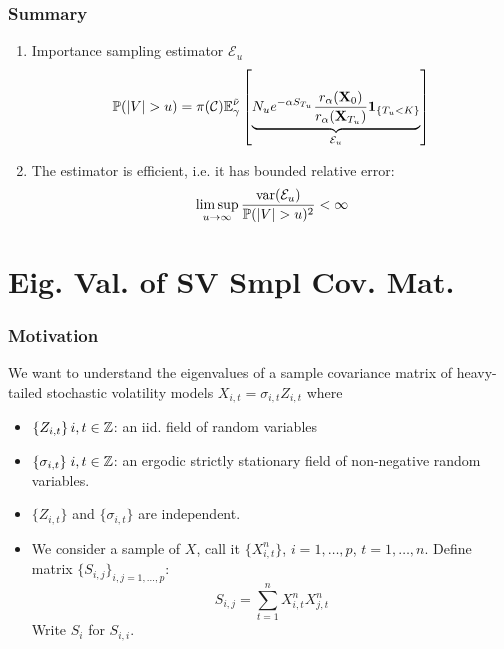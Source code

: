 \documentclass{beamer}
\begin{document}
\begin{frame}
  \frametitle{Summary}
  \begin{enumerate}
  \item Importance sampling estimator $\mathcal E_u$
    \[
    \mathbb{P}(|V| > u)
    =
    \pi(\mathcal C) \mathbb{E}_\gamma^{\tilde \nu} \left[
      \underbrace{
        N_u e^{-\alpha S_{T_u}} {r_\alpha(\mathbf{X}_0) \over r_\alpha(\mathbf{X}_{T_u})} \mathbf{1}_{\{T_u < K\}}
        }_{\mathcal E_u}
    \right]
    \]
  \item The estimator is efficient, i.e. it has bounded relative error:
    \[
    \limsup_{u \to \infty} {
      \text{var}(\mathcal E_u)
      \over
      \mathbb{P}(|V| > u)^2
    } < \infty
    \]
  \end{enumerate}
\end{frame}

\section{Eig. Val. of SV Smpl Cov. Mat.}
\begin{frame}
  \frametitle{Motivation}
  We want to understand the eigenvalues of a sample covariance matrix
  of heavy-tailed stochastic volatility models
  $X_{i, t} = \sigma_{i, t} Z_{i,t}$ where
  \begin{itemize}
  \item $\{Z_{i,t}\}\, i,t \in \mathbb Z$: an iid. field of random variables
  \item $\{\sigma_{i,t}\}\; i,t \in \mathbb Z$: an ergodic strictly
    stationary field  of non-negative random variables.
  \item $\{Z_{i,t}\}$ and $\{\sigma_{i,t}\}$ are independent.
  \item We consider a sample of $X$, call it $\{X^n_{i, t}\}$,
    $i = 1, \dots, p$, $t = 1, \dots, n$. Define matrix
    $\{S_{i, j}\}_{i,j=1,\dots, p}$:
    \[
    S_{i,j} = \sum_{t=1}^n X^n_{i,t} X^n_{j, t}
    \]
    Write $S_i$ for $S_{i,i}$.
  \end{itemize}
\end{frame}
\end{document}
